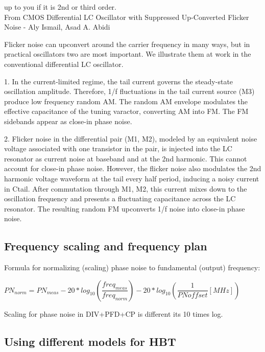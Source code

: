 \documentclass{article}
\begin{document}
up to you if it is 2nd or third order.
\\



From CMOS Differential LC Oscillator with Suppressed Up-Converted Flicker Noise - Aly Ismail, Asad A. Abidi

\begin{info}
	Flicker noise can upconvert around the carrier frequency in many ways, but in practical oscillators two are most important. We illustrate them at work in the conventional differential LC oscillator.
\end{info}

\begin{info}
	1. In the current-limited regime, the tail current governs the steady-state oscillation amplitude. Therefore, 1/f fluctuations in the tail current source (M3) produce low frequency random AM. The random AM envelope modulates the effective capacitance of the tuning varactor, converting AM into FM. The FM sidebands appear as close-in phase noise. 
\end{info}

\begin{info}
	2. Flicker noise in the differential pair (M1, M2), modeled by an equivalent noise voltage associated with one transistor in the pair, is injected into the LC resonator as current noise at baseband and at the 2nd harmonic. This cannot account for close-in phase noise. However, the flicker noise also modulates the 2nd harmonic voltage waveform at the tail every half period, inducing a noisy current in Ctail. After commutation through M1, M2, this current mixes down to the oscillation frequency and presents a fluctuating capacitance across the LC resonator. The resulting random FM upconverts 1/f noise into close-in phase noise.
\end{info}

\subsection{Frequency scaling and frequency plan}

Formula for normalizing (scaling) phase noise to fundamental (output) frequency:

$PN_{norm}=PN_{meas}-20*log_{10}(\dfrac{freq_{meas}}{freq_{norm}})-20*log_{10}(\dfrac{1}{PNoffset}[MHz])$

Scaling for phase noise in DIV+PFD+CP is different its 10 times log.


\subsection{Using different models for HBT}
\end{document}

